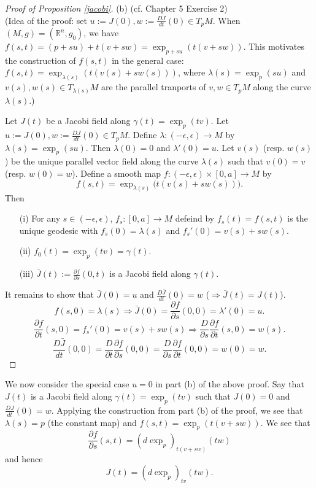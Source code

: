 \documentclass{amsart}
\numberwithin{equation}{section}
\newcommand{\bR}{\mathbb{R}}
\theoremstyle{definition}
\theoremstyle{theorem}
\begin{document}
\begin{proof}[Proof of Proposition \ref{jacobi}]
\smallskip

\noindent
(b) (cf. \cite{dC} Chapter 5 Exercise 2) \\
(Idea of the proof: set $u:=J(0), w:=\frac{DJ}{dt}(0)\in T_pM$.  When $(M,g)=(\bR^n,g_0)$, we have
$f(s,t)= (p+su)+t(v+sw) = \exp_{p+su}(t(v+sw))$. This motivates the construction of $f(s,t)$ in the general case:
$f(s,t)=\exp_{\lambda(s)}(t(v(s)+sw(s)))$, where
$\lambda(s)=\exp_p(su)$ and $v(s), w(s)\in T_{\lambda(s)}M$ are the parallel tranports of $v,w\in T_pM$ along
the curve $\lambda(s)$.)



Let $J(t)$ be a Jacobi field along $\gamma(t)=\exp_p(tv)$. Let $u:=J(0), w:=\frac{DJ}{dt}(0)\in T_pM$.
Define $\lambda:(-\epsilon,\epsilon)\to M$ by $\lambda(s)=\exp_p(su)$. Then $\lambda(0)=0$ and $\lambda'(0)=u$.
Let $v(s)$ (resp. $w(s)$) be the unique parallel vector field along the curve $\lambda(s)$ such that
$v(0)=v$ (resp. $w(0)=w$). Define a smooth map $f:(-\epsilon,\epsilon)\times [0,a]\to M$ by
$$
f(s,t)=\exp_{\lambda(s)}\big(t(v(s)+sw(s))\big).
$$ 
Then 
\begin{enumerate}
\item[(i)] For any $s\in (-\epsilon, \epsilon)$, $f_s:[0,a]\to M$ defeind by $f_s(t)=f(s,t)$ is the unique geodesic
with $f_s(0)=\lambda(s)$ and $f_s'(0)= v(s)+sw(s)$.  
\item[(ii)] $f_0(t)=\exp_p(tv)=\gamma(t)$.
\item[(iii)] $\bar{J}(t):= \frac{\partial f}{\partial s}(0,t)$ is a Jacobi field along $\gamma(t)$.
\end{enumerate}
It remains to show that $\bar{J}(0)=u$ and $\frac{D\bar{J}}{dt}(0)=w$ ($\Rightarrow \bar{J}(t)=J(t)$).
$$
f(s,0)=\lambda(s)\Rightarrow \bar{J}(0)= \frac{\partial f}{\partial s}(0,0) = \lambda'(0)=u.
$$
$$
\frac{\partial f}{\partial t}(s,0) = f_s'(0)= v(s)+ s w(s) \Rightarrow \frac{D}{\partial s}\frac{\partial f}{\partial t}(s,0)=w(s).
$$
$$
\frac{D \bar{J}}{dt}(0,0)=  \frac{D}{\partial t}\frac{\partial f}{\partial s}(0,0)=
\frac{D}{\partial s}\frac{\partial f}{\partial t}(0,0)= w(0)=w. 
$$
\end{proof}


We now consider the special case $u=0$ in part (b) of the above proof. 
Say that $J(t)$ is a Jacobi field along $\gamma(t)=\exp_p(tv)$ such that $J(0) = 0$ and $\frac{DJ}{dt}(0) = w$. 
Applying the construction from part (b) of the proof, we see that $\lambda(s)=p$ (the constant map) and 
$f(s,t) = \exp_p(t(v + sw))$. We see that 
\[
\frac{\partial f}{\partial s}(s,t) = (d \exp_p)_{t(v + sw)}(tw)
\]
and hence 
\[
J(t) = (d \exp_p)_{tv}(tw).
\]
\end{document}
